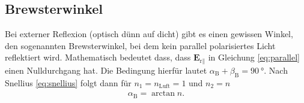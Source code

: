 \subsection{Brewsterwinkel}
Bei externer Reflexion (optisch dünn auf dicht) gibt es einen gewissen Winkel, den sogenannten Brewsterwinkel, bei dem kein 
parallel polarisiertes Licht reflektiert wird.
Mathematisch bedeutet dass, dass $\symbf{E}_{\text{r}\parallel}$ in Gleichung \eqref{eq:parallel} einen Nulldurchgang hat.
Die Bedingung hierfür lautet $\alpha_\text{B} + \beta_\text{B} = \qty{90}{\degree}$.
Nach Snellius \eqref{eq:snellius} folgt dann für $n_1 = n_\text{Luft} = 1$ und $n_2 = n$
\begin{align}
    \alpha_\text{B} = \arctan n.
    \label{eq:brewster}
\end{align}

